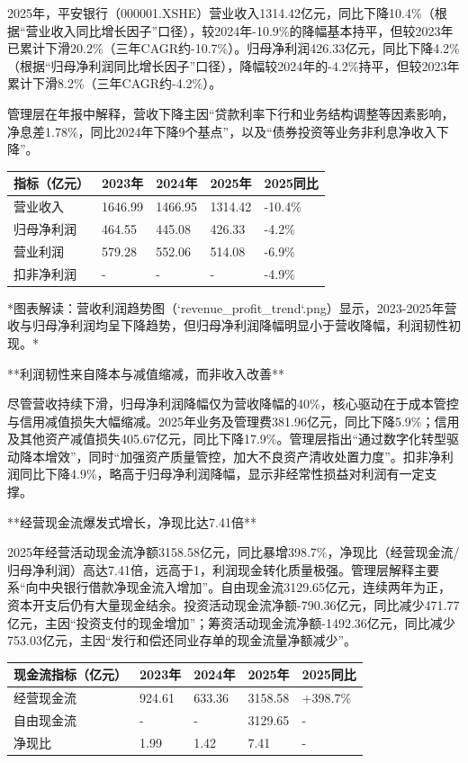 \documentclass[12pt,a4paper]{article}
\begin{document}
2025年，平安银行（000001.XSHE）营业收入1314.42亿元，同比下降10.4\%（根据“营业收入同比增长因子”口径），较2024年-10.9\%的降幅基本持平，但较2023年已累计下滑20.2\%（三年CAGR约-10.7\%）。归母净利润426.33亿元，同比下降4.2\%（根据“归母净利润同比增长因子”口径），降幅较2024年的-4.2\%持平，但较2023年累计下滑8.2\%（三年CAGR约-4.2\%）。

管理层在年报中解释，营收下降主因“贷款利率下行和业务结构调整等因素影响，净息差1.78\%，同比2024年下降9个基点”，以及“债券投资等业务非利息净收入下降”。

\begin{table}[htbp]
\centering
\begin{tabular}{lllll}
\toprule
指标（亿元） & 2023年 & 2024年 & 2025年 & 2025同比 \\
\midrule
营业收入 & 1646.99 & 1466.95 & 1314.42 & -10.4\% \\
归母净利润 & 464.55 & 445.08 & 426.33 & -4.2\% \\
营业利润 & 579.28 & 552.06 & 514.08 & -6.9\% \\
扣非净利润 & - & - & - & -4.9\% \\
\bottomrule
\end{tabular}
\end{table}


*图表解读：营收利润趋势图（`revenue\_profit\_trend`.png）显示，2023-2025年营收与归母净利润均呈下降趋势，但归母净利润降幅明显小于营收降幅，利润韧性初现。*

**利润韧性来自降本与减值缩减，而非收入改善**

尽管营收持续下滑，归母净利润降幅仅为营收降幅的40\%，核心驱动在于成本管控与信用减值损失大幅缩减。2025年业务及管理费381.96亿元，同比下降5.9\%；信用及其他资产减值损失405.67亿元，同比下降17.9\%。管理层指出“通过数字化转型驱动降本增效”，同时“加强资产质量管控，加大不良资产清收处置力度”。扣非净利润同比下降4.9\%，略高于归母净利润降幅，显示非经常性损益对利润有一定支撑。

**经营现金流爆发式增长，净现比达7.41倍**

2025年经营活动现金流净额3158.58亿元，同比暴增398.7\%，净现比（经营现金流/归母净利润）高达7.41倍，远高于1，利润现金转化质量极强。管理层解释主要系“向中央银行借款净现金流入增加”。自由现金流3129.65亿元，连续两年为正，资本开支后仍有大量现金结余。投资活动现金流净额-790.36亿元，同比减少471.77亿元，主因“投资支付的现金增加”；筹资活动现金流净额-1492.36亿元，同比减少753.03亿元，主因“发行和偿还同业存单的现金流量净额减少”。

\begin{table}[htbp]
\centering
\begin{tabular}{lllll}
\toprule
现金流指标（亿元） & 2023年 & 2024年 & 2025年 & 2025同比 \\
\midrule
经营现金流 & 924.61 & 633.36 & 3158.58 & +398.7\% \\
自由现金流 & - & - & 3129.65 & - \\
净现比 & 1.99 & 1.42 & 7.41 & - \\
\bottomrule
\end{tabular}
\end{table}
\end{document}
